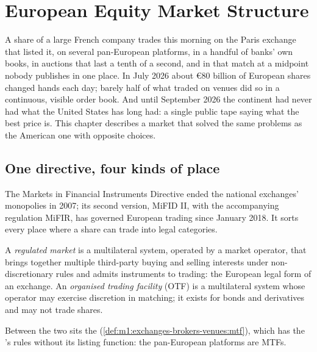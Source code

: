 \chapter{European Equity Market Structure}\label{ch:m1:european-equity-market-structure}

A share of a large French company trades this morning on the Paris exchange
that listed it, on several pan-European platforms, in a handful of banks'
own books, in auctions that last a tenth of
a second, and in  that match at a midpoint nobody publishes in one
place. In July 2026 about \euro 80 billion of European shares changed hands
each day; barely half of what traded on venues did so in a continuous,
visible order book. And until September 2026 the continent had never had what
the United States has long had: a single public tape saying what the best
price is. This chapter describes a market that solved the same
problems as the American one with opposite choices.

\section{One directive, four kinds of place}

The Markets in Financial Instruments Directive ended the national exchanges'
monopolies in 2007; its second version, MiFID II, with the accompanying
regulation MiFIR, has governed European trading since January 2018. It sorts
every place where a share can trade into legal categories.

\begin{definition}\label{def:m1:european-equity-market-structure:rm}
A \emph{regulated market} is a multilateral system,
operated by a market operator, that brings together multiple third-party
buying and selling interests under non-discretionary rules and admits
instruments to trading: the European legal form of an exchange. An
\emph{organised trading facility} (OTF) is
a multilateral system whose operator may exercise discretion in matching; it
exists for bonds and derivatives and may not trade shares.
\end{definition}

Between the two sits the 
(\cref{def:m1:exchanges-brokers-venues:mtf}), which has the 's rules without its listing function: the pan-European platforms are
MTFs.

